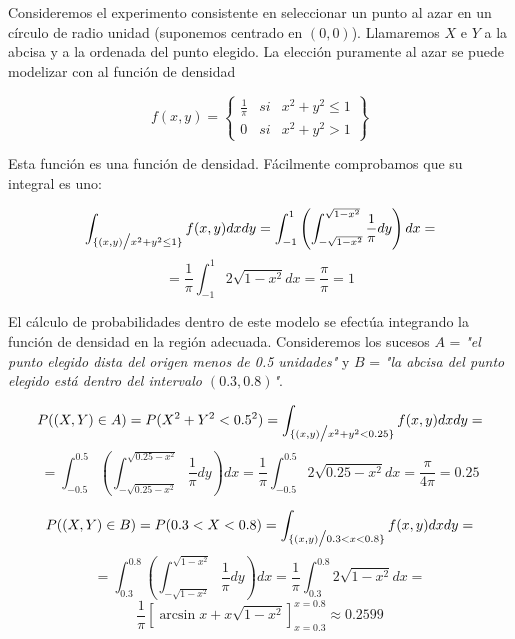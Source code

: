 \documentclass{article}
\begin{document}
\begin{theorem}
    Consideremos el experimento consistente en seleccionar un punto al azar en un círculo de radio unidad 
    (suponemos centrado en \((0, 0)\)). Llamaremos \(X\) e \(Y\) a la abcisa y a la ordenada del punto elegido. 
    La elección puramente al azar se puede modelizar con al función de densidad
    
    \[f(x, y) = \left\{
        \begin{array}{rcr}
            \frac{1}{\pi}   & si    & x^2 + y^2 \leq 1 \\
            0               & si    & x^2 + y^2 > 1
        \end{array}
    \right\}\]

    Esta función es una función de densidad. Fácilmente comprobamos que su integral es uno:

    \[\int_{\{(x, y) \big{/} x^2 + y^2 \leq 1\}} f(x, y)dxdy = \int_{-1}^{1} \left(\int_{-\sqrt{1 - x^2}}^{\sqrt{1 - x^2}} \frac{1}{\pi}dy\right)dx =\]
    \[=\frac{1}{\pi}\int_{-1}^{1} 2\sqrt{1 - x^2}dx = \frac{\pi}{\pi} = 1\]

    El cálculo de probabilidades dentro de este modelo se efectúa integrando la función de densidad en la región adecuada. 
    Consideremos los sucesos $A$ = \textit{"el punto elegido dista del origen menos de 0.5 unidades"} y $B$ = \textit{"la abcisa del 
    punto elegido está dentro del intervalo $(0.3, 0.8)$"}.
    
    \[P((X, Y) \in A) = P(X^2 + Y^2 < 0.5^2) = \int_{\{(x, y) \big{/} x^2 + y^2 < 0.25\}} f(x, y)dxdy =\]
    \[= \int_{-0.5}^{0.5} \left(\int_{-\sqrt{0.25 - x^2}}^{\sqrt{0.25 - x^2}} \frac{1}{\pi}dy\right)dx = \frac{1}{\pi}\int_{-0.5}^{0.5} 2\sqrt{0.25 - x^2}dx = \frac{\pi}{4\pi} = 0.25\]

    \[ P((X, Y) \in B) = P(0.3 < X < 0.8) = \int_{\{ (x, y) \big{/} 0.3 < x < 0.8 \}} f(x, y)dxdy = \]
    \[ = \int_{0.3}^{0.8} \left( \int_{-\sqrt{1 - x^2}}^{\sqrt{1 - x^2}} \frac{1}{\pi}dy \right) dx = \frac{1}{\pi} \int_{0.3}^{0.8} 2\sqrt{1 - x^2} dx = \]
    \[ \frac{1}{\pi} \left[ \arcsin x + x\sqrt{1 - x^2} \right]_{x = 0.3}^{x = 0.8} \approx 0.2599 \]

\end{theorem}
\end{document}
